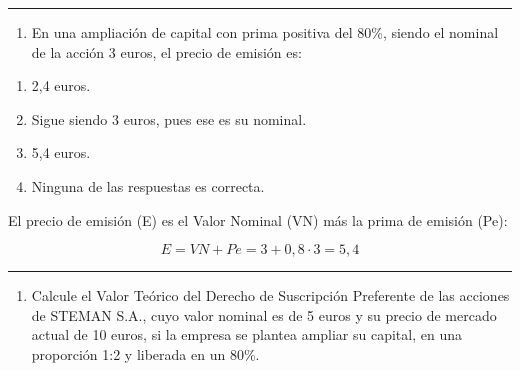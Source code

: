 \documentclass[
  letterpaper,
  DIV=11,
  numbers=noendperiod]{scrreprt}
\providecommand{\tightlist}{%
  \setlength{\itemsep}{0pt}\setlength{\parskip}{0pt}}\usepackage{longtable,booktabs,array}
\begin{document}
\begin{center}\rule{0.5\linewidth}{0.5pt}\end{center}

\begin{enumerate}
\def\labelenumi{\arabic{enumi}.}
\setcounter{enumi}{65}
\tightlist
\item
  En una ampliación de capital con prima positiva del 80\%, siendo el
  nominal de la acción 3 euros, el precio de emisión es:
\end{enumerate}

\begin{enumerate}
\def\labelenumi{\alph{enumi}.}
\item
  2,4 euros.
\item
  Sigue siendo 3 euros, pues ese es su nominal.
\item
  5,4 euros.
\item
  Ninguna de las respuestas es correcta.
\end{enumerate}

\begin{tcolorbox}[enhanced jigsaw, left=2mm, opacityback=0, colback=white, breakable, arc=.35mm, bottomrule=.15mm, rightrule=.15mm, toprule=.15mm, leftrule=.75mm, colframe=quarto-callout-tip-color-frame]
\begin{minipage}[t]{5.5mm}
\textcolor{quarto-callout-tip-color}{\faLightbulb}
\end{minipage}%
\begin{minipage}[t]{\textwidth - 5.5mm}

El precio de emisión (E) es el Valor Nominal (VN) más la prima de
emisión (Pe):

\[E = VN + Pe = 3 + 0,8\cdot 3 = 5,4\]

\end{minipage}%
\end{tcolorbox}

\begin{center}\rule{0.5\linewidth}{0.5pt}\end{center}

\begin{enumerate}
\def\labelenumi{\arabic{enumi}.}
\setcounter{enumi}{66}
\tightlist
\item
  Calcule el Valor Teórico del Derecho de Suscripción Preferente de las
  acciones de STEMAN S.A., cuyo valor nominal es de 5 euros y su precio
  de mercado actual de 10 euros, si la empresa se plantea ampliar su
  capital, en una proporción 1:2 y liberada en un 80\%.
\end{enumerate}
\end{document}
